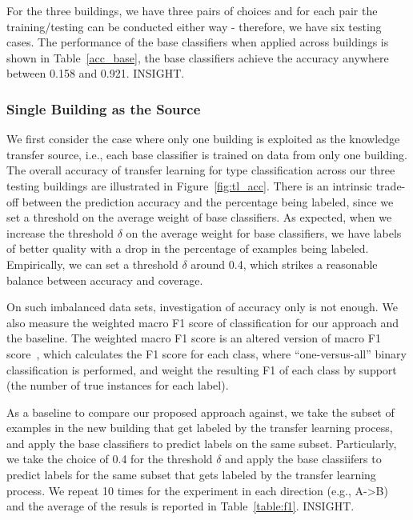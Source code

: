 For the three buildings, we have three pairs of choices and for each pair the training/testing can be conducted either way - therefore, we have six testing cases.
The performance of the base classifiers when applied across buildings is shown in Table~\ref{acc_base}, the base classifiers achieve the accuracy anywhere between 0.158 and 0.921.
INSIGHT.

\subsubsection{Single Building as the Source}
We first consider the case where only one building is exploited as the knowledge transfer source, i.e., each base classifier is trained on data from only one building. 
The overall accuracy of transfer learning for type classification across our three testing buildings are illustrated in Figure~\ref{fig:tl_acc}.
There is an intrinsic trade-off between the prediction accuracy and the percentage being labeled, since we set a threshold on the average weight of base classifiers. 
As expected, when we increase the threshold $\delta$ on the average weight for base classifiers, we have labels of better quality with a drop in the percentage of examples being labeled. Empirically, we can set a threshold $\delta$ around 0.4, which strikes a reasonable balance between accuracy and coverage.

On such imbalanced data sets, investigation of accuracy only is not enough. We also measure the weighted macro F1 score of classification for our approach and the baseline. The weighted macro F1 score is an altered version of macro F1 score~\cite{yang}, which calculates the F1 score for each class, where ``one-versus-all'' binary classification is performed, and weight the resulting F1 of each class by support (the number of true instances for each label). 

As a baseline to compare our proposed approach against, we take the subset of examples in the new building that get labeled by the transfer learning process, and apply the base classifiers to predict labels on the same subset. 
Particularly, we take the choice of 0.4 for the threshold $\delta$ and apply the base classiifers to predict labels for the same subset that gets labeled by the transfer learning process. We repeat 10 times for the experiment in each direction (e.g., A->B) and the average of the resuls is reported in Table~\ref{table:f1}. 
INSIGHT.
